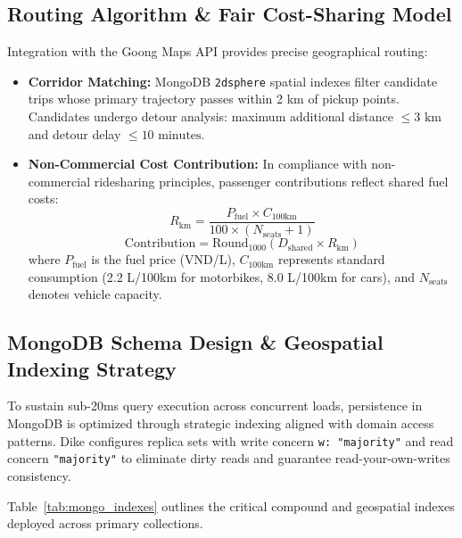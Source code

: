\documentclass[conference,10pt,a4paper]{IEEEtran}
\begin{document}
\subsection{Routing Algorithm \& Fair Cost-Sharing Model}
Integration with the Goong Maps API provides precise geographical routing:
\begin{itemize}
    \item \textbf{Corridor Matching:} MongoDB \texttt{2dsphere} spatial indexes filter candidate trips whose primary trajectory passes within 2 km of pickup points. Candidates undergo detour analysis: maximum additional distance $\le 3\text{ km}$ and detour delay $\le 10\text{ minutes}$.
    \item \textbf{Non-Commercial Cost Contribution:} In compliance with non-commercial ridesharing principles, passenger contributions reflect shared fuel costs:
    \begin{equation}
    R_{\text{km}} = \frac{P_{\text{fuel}} \times C_{\text{100km}}}{100 \times (N_{\text{seats}} + 1)}
    \end{equation}
    \begin{equation}
    \text{Contribution} = \text{Round}_{1000}\left( D_{\text{shared}} \times R_{\text{km}} \right)
    \end{equation}
    where $P_{\text{fuel}}$ is the fuel price (VND/L), $C_{\text{100km}}$ represents standard consumption (2.2 L/100km for motorbikes, 8.0 L/100km for cars), and $N_{\text{seats}}$ denotes vehicle capacity.
\end{itemize}

\subsection{MongoDB Schema Design \& Geospatial Indexing Strategy}
To sustain sub-20ms query execution across concurrent loads, persistence in MongoDB is optimized through strategic indexing aligned with domain access patterns. Dike configures replica sets with write concern \texttt{w: "majority"} and read concern \texttt{"majority"} to eliminate dirty reads and guarantee read-your-own-writes consistency.

Table~\ref{tab:mongo_indexes} outlines the critical compound and geospatial indexes deployed across primary collections.
\end{document}
